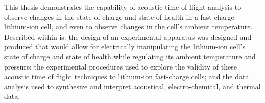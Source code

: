 This thesis demonstrates the capability of acoustic time of flight analysis to observe changes in the state of charge and state of health in a fast-charge lithium-ion cell, and even to observe changes in the cell's ambient temperature. Described within is: the design of an experimental apparatus was designed and produced that would allow for electrically manipulating the lithium-ion cell's state of charge and state of health while regulating its ambient temperature and pressure; the experimental procedures used to explore the validity of these acoustic time of flight techniques to lithium-ion fast-charge cells; and the data analysis used to synthesize and interpret acoustical, electro-chemical, and thermal data.